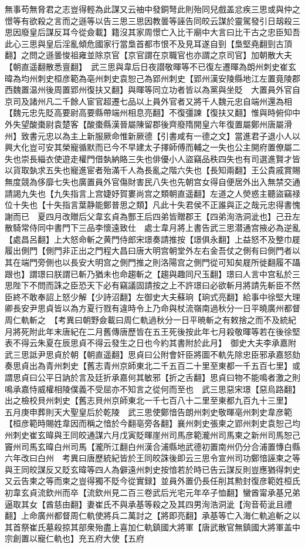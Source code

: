 無事苟無脅君之志豈得輕為此謀又云䄂中發銅弩此則殆同兒戲盖忿疾三思或與仲之憬等有欲殺之言而之遜等以告三思三思因教曇等誣告同皎云謀於靈駕發引日刼殺三思因廢皇后謀反耳今從僉載】籍沒其家周憬亡入比干廟中大言曰比干古之忠臣知吾此心三思與皇后淫亂傾危國家行當梟首都市恨不及見耳遂自剄【梟堅堯翻剄古頂翻】之問之遜曇悛祖雍並除京官【京官謂在京職官也亦謂之京司官】加朝散大夫【朝直遥翻散悉亶翻】　武三思與韋后日夜譛敬暉等不已復左遷暉為朗州刺史崔玄暐為均州刺史桓彦範為亳州刺史袁恕己為郢州刺史【郢州漢安陵縣地江左置竟陵郡西魏置温州後周置郢州復扶又翻】與暉等同立功者皆以為黨與坐貶　大置員外官自京司及諸州凡二千餘人宦官超遷七品以上員外官者又將千人魏元忠自端州還為相【魏元忠先貶高要尉高要縣帶端州相息亮翻】不復彊諫【復扶又翻】惟與時俯仰中外失望酸棗尉袁楚客【酸棗縣漢晉屬陳留郡後齊廢隋開皇六年復置屬鄭州唐屬滑州】致書元忠以為主上新服厥命惟新厥德【引書咸有一德之文】當進君子退小人以興大化豈可安其榮寵循默而已今不早建太子擇師傅而輔之一失也公主開府置僚屬二失也崇長緇衣使遊走權門借埶納賂三失也俳優小人盜竊品秩四失也有司選進賢才皆以貨取埶求五失也寵進宦者殆滿千人為長亂之階六失也【長知兩翻】王公貴戚賞賜無度競為侈靡七失也廣置員外官傷財害民八失也先朝宫女得自便居外出入無禁交通請謁九失也【九失指言上宫婕妤賀婁尚宫之類朝直遥翻】左道之人熒惑主聽盜竊禄位十失也【十失指言葉静能鄭普思之類】凡此十失君侯不正誰與正之哉元忠得書愧謝而已　夏四月改贈后父韋玄貞為酆王后四弟皆贈郡王【四弟洵浩洞泚也】己丑左散騎常侍同中書門下三品李懷遠致仕　處士韋月將上書告武三思潜通宫掖必為逆亂【處昌呂翻】上大怒命斬之黄門侍郎宋璟奏請推按【璟俱永翻】上益怒不及整巾屣履出側門【側門非正出之門程大昌曰唐大明宫朝堂外左右金吾仗之側有曰側門者以其在端門旁側也以長安大明宫之側門推之則洛陽宫之側門從可知矣屣所徙翻履不躡跟也】謂璟曰朕謂已斬乃猶未也命趨斬之【趨與趣同尺玉翻】璟曰人言中宫私於三思陛下不問而誅之臣恐天下必有竊議固請按之上不許璟曰必欲斬月將請先斬臣不然臣終不敢奉詔上怒少解【少詩沼翻】左御史大夫蘇珦【珦式亮翻】給事中徐堅大理卿長安尹思貞皆以為方夏行戮有違時令上乃命與杖流嶺南過秋分一日平曉廣州都督周仁軌斬之　【考異曰朝野僉載曰周仁軌過秋分一日平暁斬之有敕捨之而不及統紀月將死附此年末唐紀在二月舊傳唐歷皆在五王死後按此年七月殺敬暉等若在後徐堅表不得云朱夏在辰思貞不得云發生之日也今約其書附於此月】　御史大夫李承嘉附武三思詆尹思貞於朝【朝直遥翻】思貞曰公附會奸臣將圖不軌先除忠臣邪承嘉怒劾奏思貞出為青州刺史【舊志青州京師東北二千五百二十里至東都一千五百七里】或謂思貞曰公平日訥於言及廷折承嘉何其敏邪【折之舌翻】思貞曰物不能鳴者激之則鳴承嘉恃威權相陵僕義不受屈亦不知言之從何而至也　武三思惡宋璟【惡烏路翻】出之檢校貝州刺史【舊志貝州京師東北一千七百八十二里至東都九百九十三里】　五月庚申葬則天大聖皇后於乾陵　武三思使鄭愔告朗州刺史敬暉亳州刺史韋彦範【桓彦範時賜姓韋因而稱之愔於今翻亳旁各翻】襄州刺史張柬之郢州刺史袁恕己均州刺史崔玄暐與王同皎通謀六月戊寅貶暉崖州司馬彦範瀧州司馬柬之新州司馬恕己竇州司馬玄暐白州司馬【瀧所江翻白州漢合浦縣地武德初置南州仍分合浦置慱白縣六年改曰白州　考異曰唐歷統紀皆於王同皎誅後即云三思令宣州司功鄭愔誣柬之等與王同皎謀反又貶玄暐等四人為僻遠州刺史按愔若於時已告云謀反則豈應猶得刺史又云告柬之等而柬之豈得獨不貶今從實録】並員外置仍長任削其勲封復彦範姓桓氏　初韋玄貞流欽州而卒【流欽州見二百三卷武后光宅元年卒子恤翻】蠻酋甯承基兄弟逼取其女【酋慈由翻】妻崔氏不與承基等殺之及其四男洵浩洞泚【洵音荀泚且禮翻】上命廣州都督周仁軌使將兵二萬討之【將即亮翻】承基等亡入海仁軌追斬之以其首祭崔氏墓殺掠其部衆殆盡上喜加仁軌鎮國大將軍【唐武散官無鎮國大將軍盖中宗創置以寵仁軌也】充五府大使【五府
